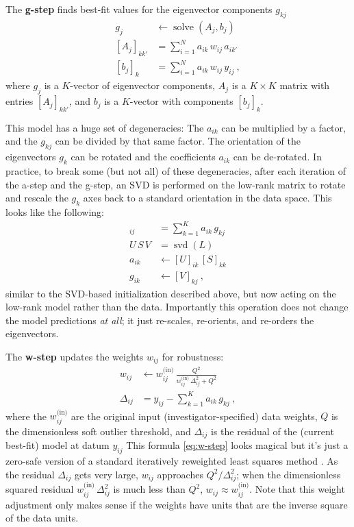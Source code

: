 \documentclass{article}
\DeclareMathOperator{\solve}{solve}
\DeclareMathOperator{\svd}{svd}
\begin{document}
The \textbf{g-step} finds best-fit values for the eigenvector components $g_{kj}$
\begin{align}
    g_j &\leftarrow \solve(A_j, b_j) \label{eq:g-step} \\
    [A_j]_{kk'} &= \sum_{i=1}^N a_{ik}\,w_{ij}\,a_{ik'} \\
    [b_j]_k     &= \sum_{i=1}^N a_{ik}\,w_{ij}\,y_{ij} ~,
\end{align}
where $g_j$ is a $K$-vector of eigenvector components,
$A_j$ is a $K\times K$ matrix with entries $[A_j]_{kk'}$,
and $b_j$ is a $K$-vector with components $[b_j]_k$.

This model has a huge set of degeneracies:
The $a_{ik}$ can be multiplied by a factor, and the $g_{kj}$ can be divided by that same factor.
The orientation of the eigenvectors $g_k$ can be rotated and the coefficients $a_{ik}$ can be de-rotated.
In practice, to break some (but not all) of these degeneracies, after each iteration of the a-step and the g-step,
an SVD is performed on the low-rank matrix
to rotate and rescale the $g_k$ axes back to a standard orientation in the data space.
This looks like the following:
\begin{align}
    [L]_{ij} &= \sum_{k=1}^K a_{ik}\,g_{kj} \\
    U\,S\,V &= \svd(L) \\
    a_{ik} &\leftarrow [U]_{ik}\,[S]_{kk} \\
    g_{ik} &\leftarrow [V]_{kj} ~,
\end{align}
similar to the SVD-based initialization described above, but now acting on the low-rank model rather than the data.
Importantly this operation does not change the model predictions \emph{at all}; it just re-scales, re-orients, and re-orders the eigenvectors.

The \textbf{w-step} updates the weights $w_{ij}$ for robustness:
\begin{align}
    w_{ij} &\leftarrow w^\text{(in)}_{ij}\,\frac{Q^2}{w^\text{(in)}_{ij}\,\Delta_{ij}^2 + Q^2} \label{eq:w-step} \\
    \Delta_{ij} &= y_{ij} - \sum_{k=1}^K a_{ik}\,g_{kj} ~,
\end{align}
where the $w^\text{(in)}_{ij}$ are the original input (investigator-specified) data weights,
$Q$ is the dimensionless soft outlier threshold,
and $\Delta_{ij}$ is the residual of the (current best-fit) model at datum $y_{ij}$
This formula \eqref{eq:w-step} looks magical but it's just a zero-safe version of a standard iteratively reweighted least squares method \cite{irls}.
As the residual $\Delta_{ij}$ gets very large, $w_{ij}$ approaches $Q^2 / \Delta_{ij}^2$; when the dimensionless squared residual $w^\text{(in)}_{ij}\,\Delta_{ij}^2$ is much less than $Q^2$, $w_{ij}\approx w^\text{(in)}_{ij}$.
Note that this weight adjustment only makes sense if the weights have units that are the inverse square of the data units.
\end{document}
